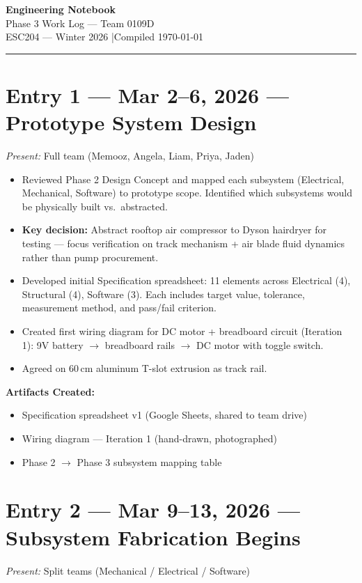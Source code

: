 \documentclass[12pt, letterpaper]{article}
\newcommand{\logentry}[2]{%
  \section{#1}%
  \textit{Present:} #2\par\vspace{1pt}%
}
\newcommand{\artifacts}{\par\vspace{1pt}\textbf{Artifacts Created:}\vspace{0pt}}
\begin{document}
\begin{center}
  {\LARGE\bfseries Engineering Notebook}\\[2pt]
  {\large Phase 3 Work Log --- Team 0109D}\\[1pt]
  {\normalsize ESC204 --- Winter 2026 \quad|\quad Compiled \today}
\end{center}
\vspace{2pt}
\textcolor{rulegray}{\rule{\linewidth}{0.8pt}}
\vspace{2pt}

\logentry{Entry 1 \textnormal{---} Mar 2--6, 2026 \textnormal{---} Prototype System Design}{Full team (Memooz, Angela, Liam, Priya, Jaden)}

\begin{itemize}
  \item Reviewed Phase 2 Design Concept and mapped each subsystem (Electrical, Mechanical, Software) to prototype scope. Identified which subsystems would be physically built vs.\ abstracted.
  \item \textbf{Key decision:} Abstract rooftop air compressor to Dyson hairdryer for testing --- focus verification on track mechanism + air blade fluid dynamics rather than pump procurement.
  \item Developed initial Specification spreadsheet: 11 elements across Electrical (4), Structural (4), Software (3). Each includes target value, tolerance, measurement method, and pass/fail criterion.
  \item Created first wiring diagram for DC motor + breadboard circuit (Iteration 1): 9V battery $\rightarrow$ breadboard rails $\rightarrow$ DC motor with toggle switch.
  \item Agreed on 60\,cm aluminum T-slot extrusion as track rail.
\end{itemize}

\artifacts
\begin{itemize}
  \item Specification spreadsheet v1 (Google Sheets, shared to team drive)
  \item Wiring diagram --- Iteration 1 (hand-drawn, photographed)
  \item Phase 2 $\rightarrow$ Phase 3 subsystem mapping table
\end{itemize}

\logentry{Entry 2 \textnormal{---} Mar 9--13, 2026 \textnormal{---} Subsystem Fabrication Begins}{Split teams (Mechanical / Electrical / Software)}
\end{document}
